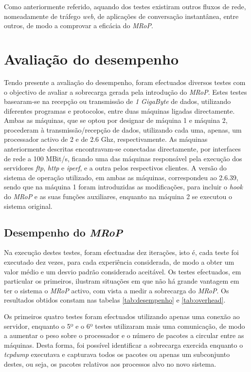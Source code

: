 Como anteriormente referido, aquando dos testes existiram outros fluxos de rede, nomeadamente de tráfego \textit{web}, de aplicações de conversação instantânea, entre outros, de modo a comprovar a eficácia do \textit{MRoP}.

\section{Avaliação do desempenho}
\label{sec:eval_performance}

Tendo presente a avaliação do desempenho, foram efectuados diversos testes com o objectivo de avaliar a sobrecarga gerada pela introdução do \textit{MRoP}.
Estes testes basearam-se na recepção ou transmissão de \textit{1 GigaByte} de dados, utilizando diferentes programas e protocolos, entre duas máquinas ligadas directamente.
Ambas as máquinas, que se optou por designar de máquina 1 e máquina 2, procederam à transmissão/recepção de dados, utilizando cada uma, apenas, um processador activo de 2 e de 2.6 Ghz, respectivamente.
As máquinas anteriormente descritas encontravam-se conectadas directamente, por interfaces de rede a 100 MBit/s, ficando uma das máquinas responsável pela execução dos servidores \textit{ftp}, \textit{http} e \textit{iperf}, e a outra pelos respectivos clientes.
A versão do sistema de operação utilizado, em ambas as máquinas, correspondeu ao 2.6.39, sendo que na máquina 1 foram introduzidas as modificações, para incluir o \textit{hook} do \textit{MRoP} e as suas funções auxiliares, enquanto na máquina 2 se executou o sistema original.

\subsection{Desempenho do \textit{MRoP}}


Na execução destes testes, foram efectuadas dez iterações, isto é, cada teste foi executado dez vezes, para cada experiência considerada, de modo a obter um valor médio e um desvio padrão considerado aceitável.
Os testes efectuados, em particular os primeiros, ilustram situações em que não há grande vantagem em ter o sistema o \textit{MRoP} activo, com vista a medir a sobrecarga do \textit{MRoP}.
Os resultados obtidos constam nas tabelas \ref{tab:desempenho} e \ref{tab:overhead}.

Os primeiros quatro testes foram efectuados utilizando apenas uma conexão ao servidor, enquanto o 5º e o 6º testes utilizaram mais uma comunicação, de modo a aumentar o peso sobre o processador e o número de pacotes a circular entre as máquinas.
Desta forma, foi possível identificar a sobrecarga exercida enquanto o \textit{tcpdump} executava e capturava todos os pacotes ou apenas um subconjunto destes, ou seja, os pacotes relativos aos processos alvo no novo sistema.

